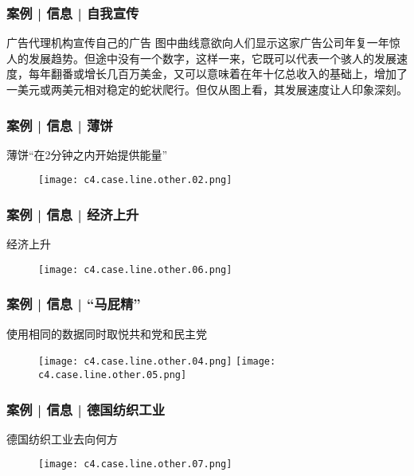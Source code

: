 \begin{frame}
  \frametitle{案例 | 信息 | 自我宣传}
  \begin{block}{广告代理机构宣传自己的广告}
图中曲线意欲向人们显示这家广告公司年复一年惊人的发展趋势。但途中没有一个数字，这样一来，它既可以代表一个骇人的发展速度，每年翻番或增长几百万美金，又可以意味着在年十亿总收入的基础上，增加了一美元或两美元相对稳定的蛇状爬行。但仅从图上看，其发展速度让人印象深刻。
  \end{block}
\end{frame}

\begin{frame}
  \frametitle{案例 | 信息 | 薄饼}
  \begin{block}{薄饼“在2分钟之内开始提供能量”}
    \begin{figure}
      \centering
      \texttt{[image: c4.case.line.other.02.png]}
    \end{figure}
  \end{block}
\end{frame}

\begin{frame}
  \frametitle{案例 | 信息 | 经济上升}
  \begin{block}{经济上升}
  \begin{figure}
    \centering
    \texttt{[image: c4.case.line.other.06.png]}
  \end{figure}
  \end{block}
\end{frame}

\begin{frame}
  \frametitle{案例 | 信息 | “马屁精”}
  \begin{block}{使用相同的数据同时取悦共和党和民主党}
    \begin{figure}
      \centering
      \texttt{[image: c4.case.line.other.04.png]}\quad
      \texttt{[image: c4.case.line.other.05.png]}
    \end{figure}
  \end{block}
\end{frame}

\begin{frame}
  \frametitle{案例 | 信息 | 德国纺织工业}
  \begin{block}{德国纺织工业去向何方}
    \begin{figure}
      \centering
      \texttt{[image: c4.case.line.other.07.png]}
    \end{figure}
  \end{block}
\end{frame}

